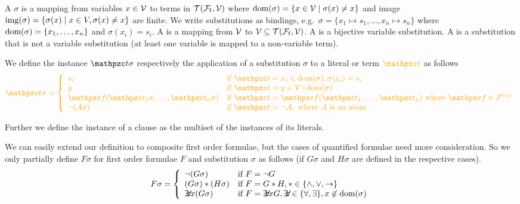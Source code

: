 


\begin{definition}\label{def:substitution}
	A  \( \sigma \) is a mapping from variables \( x\in\mathcal{V} \) to terms in \( {\mathcal{T}(\mathcal{F}_{\mathsf{f}},\mathcal{V})} \)
	where \( \operatorname{dom}(\sigma) = \{ x\in\mathcal{V}\mid\sigma(x) \neq x \} \)
	and image \( \operatorname{img}(\sigma) =\{ \sigma(x) \mid x\in V, \sigma(x)\neq x \} \) are finite.
	We write substitutions as bindings, e.g.~\( \sigma=\{ x_1\mapsto s_1,\ldots,x_n\mapsto s_n \} \)
	where \( \operatorname{dom}(\sigma)=\{ x_1,\ldots,x_n \} \) and \( \sigma(x_i)=s_i \).
	A  is a mapping from \( \mathcal{V} \) to \( \mathcal{V}\subseteq{\mathcal{T}(\mathcal{F}_{\mathsf{f}},\mathcal{V})} \).
	A  is a bijective variable substitution.
	A  is a substitution that is not a variable substitution
	(at least one variable is mapped to a non-variable term).
\end{definition}
\begin{definition}
	We define the instance \( \mct\sigma \)
	respectively the application of a substitution \( \sigma \) to a literal or term \( \foxt \) as follows
	\begin{gather*}
	\MDEFINE{\foxt\sigma}{ll}{
			s_i & \text{if }\foxt=x_i\in\domain(\sigma), \sigma(x_i) = s_i
			\\
			y & \text{if }\foxt=y\in\mcV \, \backslash\domain(\sigma)
			\\
			\foxf(\foxt_1\sigma,\ldots,\foxt_n\sigma)	&\text{if }\foxt=\foxf(\foxt_1,\ldots,\foxt_n)
			\text{ where  }
			 \foxf\in\mcFn \\
			 \lnot (A\sigma) &\text{if }\foxt = \lnot A, \text{ where } A\text{ is an atom}
			 }
	\end{gather*}

\noindent Further we define the instance of a clause as the multiset of the instances of its literals.
\end{definition}

\begin{definition}
	We can easily extend our definition to composite first order formulae,
	but the cases of quantified formulae need more consideration.
	So we only partially define \( F\sigma \) for first order formulae \( F \) and substitution \( \sigma \) as follows (if \( G\sigma \) and \( H\sigma \) are defined in the respective cases).
	\begin{gather*}
	\MDEFINE{F\sigma}{ll}{
		\lnot(G\sigma) & \text{if }F = \lnot G
		\\
		(G\sigma) * (H\sigma) & \text{if }F = G * H, *\in \{ \land, \lor, \limp \}
		\\
		\quantify x (G\sigma) &\text{if }F = \quantify x G,
		\quantify \in \{ \forall, \exists \},
		x\not\in\domain(\sigma)
	}
	\end{gather*}
\end{definition}


